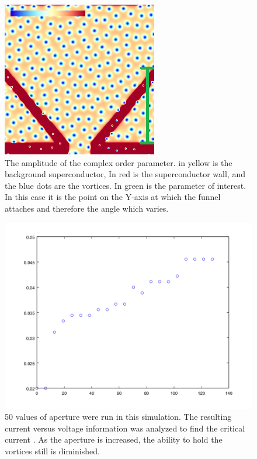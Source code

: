 \begin{figure}[htbp]
\begin{center}
\includegraphics[scale=.50]{normalY.png}
\caption{ The amplitude of the complex order parameter. in yellow is the background superconductor, In red is the superconductor wall, and the blue dots are the vortices. In green is the parameter of interest. In this case it is the point on the Y-axis at which the funnel attaches and therefore the angle which varies. }
\label{normalY}
\end{center}
\end{figure}

\begin{figure}[htbp]
\begin{center}
\includegraphics[scale=.50]{normalYscan.png}
\caption{ 50 values of aperture were run in this simulation. The resulting current versus voltage information was analyzed to find the critical current . As the aperture is increased, the ability to hold the vortices still is diminished. }
\label{normalYscan}
\end{center}
\end{figure}


